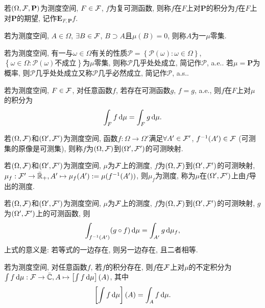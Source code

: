 \begin{definition}
    若$(\Omega,\mathcal{F},\mathbf{P})$为测度空间, $F\in\mathcal{F}$, $f$为复可测函数, 则称$f$在$F$上对$\mathbf{P}$的积分为$f$在$F$上对$\mathbf{P}$的期望, 记作$\mathbf{E}_{F,\mathbf{P}}f$.
\end{definition}

\begin{definition}
    若\s{}为测度空间, $A\in\Omega$, $\exists  B\in\mathcal{F}$, $B\supset A$且$\mu(B)=0$, 则称$A$为一$\mu$零集.
\end{definition}

\begin{definition}
    若\s{}为测度空间, 有一与$\omega\in\Omega$有关的性质$\mathscr{P}=\left\{\mathscr{P}(\omega):\omega\in\Omega\right\}$, $\left\{\omega\in\Omega:\mathscr{P}(\omega)\text{不成立}\right\}$为$\mu$零集, 则称$\mathscr{P}$几乎处处成立, 简记作$\mathscr{P}$, a.e.. 若$\mu=\mathbf{P}$为概率, 则$\mathscr{P}$几乎处处成立又称$\mathscr{P}$几乎必然成立, 简记作$\mathscr{P}$, a.s..
\end{definition}

\begin{definition}
    若\s{}为测度空间, $F\in\mathcal{F}$, 对任意函数$f$, 若存在可测函数$g$, $f=g$, a.e., 则$f$在$F$上对$\mu$的积分为
    \begin{equation}
        \int_{F}f\,\mathrm{d}\mu=\int_{F}g\,\mathrm{d}\mu.
    \end{equation}
\end{definition}

\begin{definition}
    若$(\Omega,\mathcal{F})$和$(\Omega',\mathcal{F}')$为测度空间, 函数$f:\Omega\to\Omega'$满足$\forall A' \in \mathcal{F}'$, $f^{-1}(A')\in\mathcal{F}$ (可测集的原像是可测集), 则称$f$为$(\Omega,\mathcal{F})$到$(\Omega',\mathcal{F}')$的可测映射.
\end{definition}

\begin{definition}
    若$(\Omega,\mathcal{F})$和$(\Omega',\mathcal{F}')$为测度空间, $\mu$为$\mathcal{F}$上的测度, $f$为$(\Omega,\mathcal{F})$到$(\Omega',\mathcal{F}')$的可测映射, $\mu_f:\mathcal{F}'\to \bar{\mathbb{R}}_+,A'\mapsto\mu_f(A'):=\mu(f^{-1}(A'))$, 则$\mu_f$为测度, 称为$\mu$在$(\Omega',\mathcal{F}')$上由$f$导出的测度.
\end{definition}

\begin{theorem}
    若$(\Omega,\mathcal{F})$和$(\Omega',\mathcal{F}')$为测度空间, $\mu$为$\mathcal{F}$上的测度, $f$为$(\Omega,\mathcal{F})$到$(\Omega',\mathcal{F}')$的可测映射, $g$为$(\Omega',\mathcal{F}')$上的可测函数, 则
    \begin{equation}
        \int_{f^{-1}(A')}(g\circ f)\,\mathrm{d}\mu=\int_{A'}g\,\mathrm{d}\mu_f,
    \end{equation}
    上式的意义是: 若等式的一边存在, 则另一边存在, 且二者相等.
\end{theorem}

\begin{definition}
    若\s{}为测度空间, 对任意函数$f$, 若$f$的积分存在, 则$f$在$\mathcal{F}$上对$\mu$的不定积分为$\int f\,\mathrm{d}\mu:\mathcal{F}\to\bar{\mathbb{C}},A\mapsto\left[\int f\,\mathrm{d}\mu\right](A)$, 其中
    \begin{equation}
        \left[\int f\,\mathrm{d}\mu\right](A)=\int_A f\,\mathrm{d}\mu.
    \end{equation}
\end{definition}
